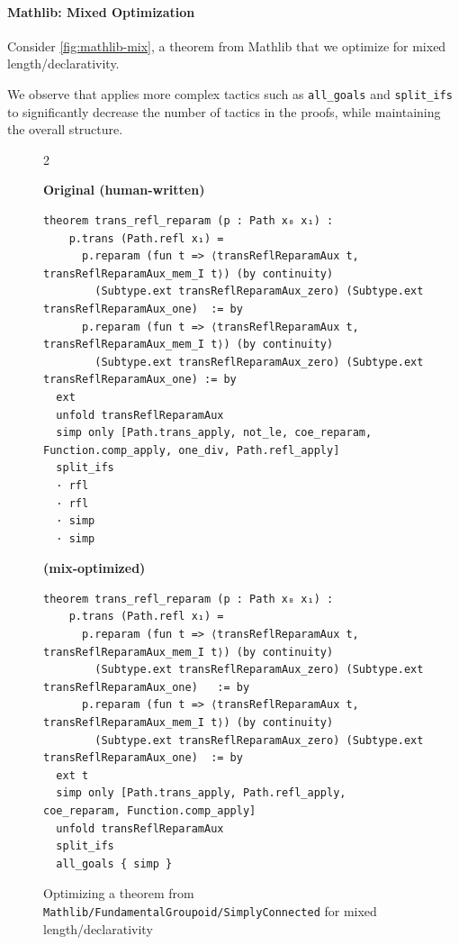 \vspace{15px}
\paragraph{Mathlib: Mixed Optimization}


Consider \autoref{fig:mathlib-mix}, a theorem from Mathlib that we optimize for mixed length/declarativity. 

We observe that \methodname{} applies more complex tactics such as \texttt{all\_goals} and \texttt{split\_ifs} to significantly decrease the number of tactics in the proofs, while maintaining the overall structure.


\setlength{\columnsep}{0.2cm}
\begin{figure}[ht]
\begin{multicols}{2}

{
\textbf{Original (human-written)}
\begin{scriptsize}
\begin{lstlisting}[basicstyle=\scriptsize\ttfamily]
theorem trans_refl_reparam (p : Path x₀ x₁) :
    p.trans (Path.refl x₁) =
      p.reparam (fun t => ⟨transReflReparamAux t, transReflReparamAux_mem_I t⟩) (by continuity)
        (Subtype.ext transReflReparamAux_zero) (Subtype.ext transReflReparamAux_one)  := by
      p.reparam (fun t => ⟨transReflReparamAux t, transReflReparamAux_mem_I t⟩) (by continuity)
        (Subtype.ext transReflReparamAux_zero) (Subtype.ext transReflReparamAux_one) := by
  ext
  unfold transReflReparamAux
  simp only [Path.trans_apply, not_le, coe_reparam, Function.comp_apply, one_div, Path.refl_apply]
  split_ifs
  · rfl
  · rfl
  · simp
  · simp
\end{lstlisting}
\end{scriptsize}
}
\vfill\null
\columnbreak
{
\textbf{\methodname{} (mix-optimized)}
\begin{scriptsize}
\begin{lstlisting}[basicstyle=\scriptsize\ttfamily]
theorem trans_refl_reparam (p : Path x₀ x₁) :
    p.trans (Path.refl x₁) =
      p.reparam (fun t => ⟨transReflReparamAux t, transReflReparamAux_mem_I t⟩) (by continuity)
        (Subtype.ext transReflReparamAux_zero) (Subtype.ext transReflReparamAux_one)   := by
      p.reparam (fun t => ⟨transReflReparamAux t, transReflReparamAux_mem_I t⟩) (by continuity)
        (Subtype.ext transReflReparamAux_zero) (Subtype.ext transReflReparamAux_one)  := by
  ext t
  simp only [Path.trans_apply, Path.refl_apply, coe_reparam, Function.comp_apply]
  unfold transReflReparamAux
  split_ifs
  all_goals { simp }
\end{lstlisting}
\end{scriptsize}
}
\end{multicols}
\vspace{-2.5em}
\caption{Optimizing a theorem from \texttt{Mathlib/FundamentalGroupoid/SimplyConnected} for mixed length/declarativity}
\vspace{-1em}
\label{fig:mathlib-mix}
\end{figure}



